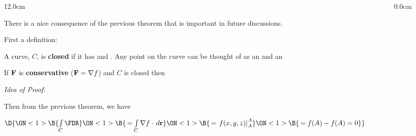 \begin{frame}
\begin{columns}\begin{column}{12.0cm}

\vspace{0.1cm}

\scriptsize

There is a nice consequence of the previous theorem that is important in future discussions.

\vspace{0.4cm}

First a definition:

\vspace{0.4cm}

\DEF A curve, $C$, is {\bf closed} if it has 
 and 
.  Any point on the curve can be thought of as an
 and an

\vspace{0.5cm}

\THM If ${\bf F}$ is {\bf conservative} (${\bf F} = \nabla f$) and $C$ is closed then

\vspace{0.1cm}

\begin{center}
\end{center}

\vspace{0.2cm}

{\em Idea of Proof}:  

\vspace{0.3cm}

Then from the previous theorem, we have

\vspace{0.4cm}

\begin{center}
	$\D{
	\ON<1>{\B{\int \limits_{C} \FDR }}
	\ON<1>{\B{\, = \int \limits_{C} \nabla f \cdot \, d{\bf r} }}
	\ON<1>{\B{\, = \left.f(x,y,z)\right|_A^A }}
	\ON<1>{\B{\, = f(A) - f(A) = 0}}}$
\end{center}

\vspace{0.8cm}

\end{column}\begin{column}{0.0cm}\end{column}\end{columns}
\end{frame}

